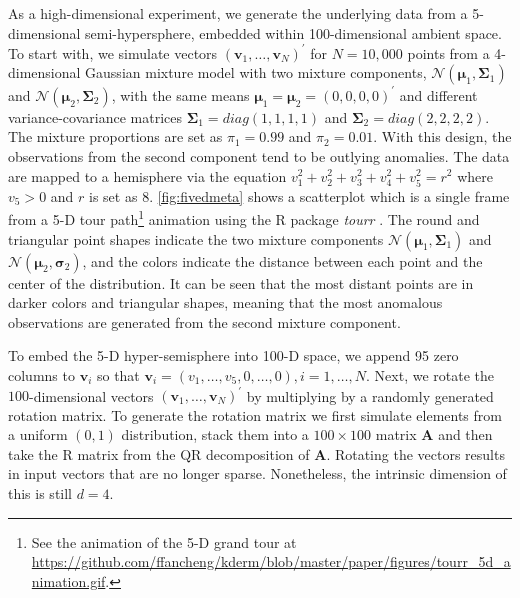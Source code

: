 \documentclass[11pt,a4paper,]{article}
\begin{document}
As a high-dimensional experiment, we generate the underlying data from a 5-dimensional semi-hypersphere, embedded within 100-dimensional ambient space. To start with, we simulate vectors \((\pmb{v}_1, \dots, \pmb{v}_N)^\prime\) for \(N=10,000\) points from a 4-dimensional Gaussian mixture model with two mixture components, \(\mathcal{N}(\pmb{\mu}_1, \pmb{\Sigma}_1)\) and \(\mathcal{N}(\pmb{\mu}_2, \pmb{\Sigma}_2)\), with the same means \(\pmb{\mu}_1 = \pmb{\mu}_2 =(0, 0, 0, 0)^\prime\) and different variance-covariance matrices \(\pmb{\Sigma}_1 = diag(1,1,1,1)\) and \(\pmb{\Sigma}_2 = diag(2,2,2,2)\). The mixture proportions are set as \(\pi_1=0.99\) and \(\pi_2=0.01\). With this design, the observations from the second component tend to be outlying anomalies. The data are mapped to a hemisphere via the equation
\(v_1^2 + v_2^2 + v_3^2 + v_4^2 + v_5^2 = r^2\) where \(v_5>0\) and \(r\) is set as \(8\).
\autoref{fig:fivedmeta} shows a scatterplot which is a single frame from a 5-D tour path\footnote{See the animation of the 5-D grand tour at \url{https://github.com/ffancheng/kderm/blob/master/paper/figures/tourr_5d_animation.gif}.} animation using the R package \emph{tourr} \autocite{Wickham2011-ir}. The round and triangular point shapes indicate the two mixture components \(\mathcal{N}(\pmb{\mu}_1, \pmb{\Sigma}_1)\) and
\(\mathcal{N}(\pmb{\mu}_2, \pmb{\sigma}_2)\), and the colors indicate the distance between each point and the center of the distribution. It can be seen that the most distant points are in darker colors and triangular shapes, meaning that the most anomalous observations are generated from the second mixture component.

To embed the 5-D hyper-semisphere into 100-D space, we append 95 zero columns to \(\pmb{v}_i\) so that \(\pmb{v}_i=(v_1, \dots, v_5, 0, \dots, 0), i=1,\dots,N\). Next, we rotate the \(100\)-dimensional vectors \((\pmb{v}_1, \dots, \pmb{v}_N)^\prime\) by multiplying by a randomly generated rotation matrix. To generate the rotation matrix we first simulate elements from a uniform \((0,1)\) distribution, stack them into a \(100\times 100\) matrix \(\pmb{A}\) and then take the R matrix from the QR decomposition of \(\pmb{A}\). Rotating the vectors results in input vectors that are no longer sparse. Nonetheless, the intrinsic dimension of this is still \(d=4\).
\end{document}
